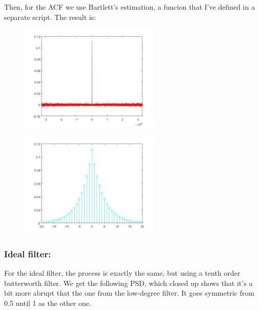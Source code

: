\documentclass[a4paper,11pt]{article}
\begin{document}
Then, for the ACF we use Bartlett's estimation, a funcion that I've defined in a separate script. The result is:

\begin{figure}[!hp]
    \begin{center}
    \includegraphics[width=0.6\textwidth]{images/lab2_figure3.jpg}
    \end{center}
\end{figure}

\newpage

\begin{figure}[!hp]
    \begin{center}
    \includegraphics[width=0.6\textwidth]{images/lab2_figure2.jpg}
    \end{center}
\end{figure}

\newpage

\subsubsection{Ideal filter:}

For the ideal filter, the process is exactly the same, but using a tenth order butterworth filter. We get the following PSD, which closed up shows that it's a bit more abrupt that the one from the low-degree filter. It goes symmetric from 0.5 until 1 as the other one.
\end{document}
